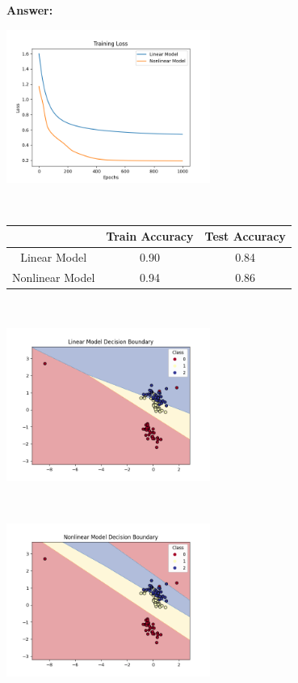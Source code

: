 \documentclass[11pt, oneside]{article}   	%
\begin{document}
\textbf{Answer:} \\
\begin{center}
    \includegraphics[width=0.5\textwidth]{Trainloss.png}
\end{center}
\\
\begin{center}
    \begin{tabular}{|c|c|c|}
        \hline
        & Train Accuracy & Test Accuracy \\ \hline
        Linear Model & 0.90 & 0.84 \\ \hline
        Nonlinear Model & 0.94 & 0.86 \\ \hline
    \end{tabular}
\end{center}
\\
\begin{center}
    \includegraphics[width=0.5\textwidth]{LinearDecisionBoundary.png}
\end{center}
\\
\begin{center}
    \includegraphics[width=0.5\textwidth]{NonlinearDecisionBoundary.png}
\end{center}
\end{document}
